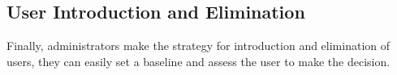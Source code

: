 
\subsection{User Introduction and Elimination} %
\label{sub:control}
Finally, administrators make the strategy for introduction and elimination of users, they can easily set a baseline and assess the user to make the decision.  



